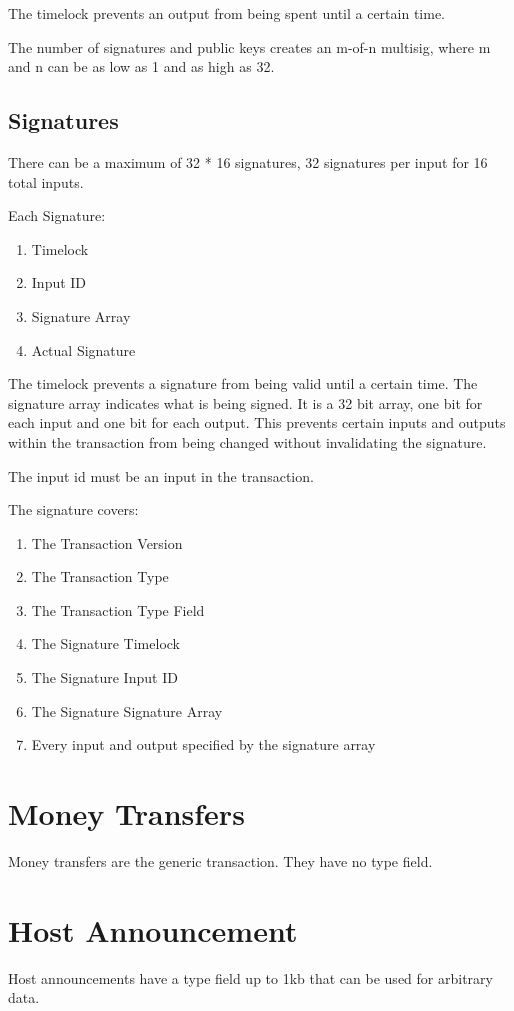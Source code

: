 \documentclass[twocolumn]{article}
\begin{document}
The timelock prevents an output from being spent until a certain time.

The number of signatures and public keys creates an m-of-n multisig, where m and n can be as low as 1 and as high as 32.

\subsection{Signatures}
There can be a maximum of 32 * 16 signatures, 32 signatures per input for 16 total inputs.

Each Signature:
\begin{enumerate}
	\item Timelock
	\item Input ID
	\item Signature Array
	\item Actual Signature
\end{enumerate}

The timelock prevents a signature from being valid until a certain time.
The signature array indicates what is being signed.
It is a 32 bit array, one bit for each input and one bit for each output.
This prevents certain inputs and outputs within the transaction from being changed without invalidating the signature.

The input id must be an input in the transaction.

The signature covers:
\begin{enumerate}
	\item The Transaction Version
	\item The Transaction Type
	\item The Transaction Type Field
	\item The Signature Timelock
	\item The Signature Input ID
	\item The Signature Signature Array
	\item Every input and output specified by the signature array
\end{enumerate}

\section{Money Transfers}
Money transfers are the generic transaction.
They have no type field.

\section{Host Announcement}
Host announcements have a type field up to 1kb that can be used for arbitrary data.
\end{document}
